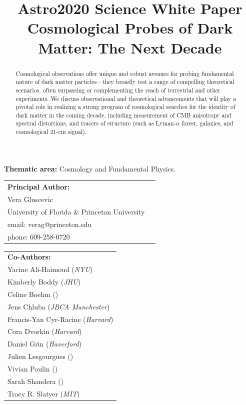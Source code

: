 \documentclass[12pt]{article}
\title{\textbf{Astro2020 Science White Paper}\\
\vspace{0.5cm}
Cosmological Probes of Dark Matter: The Next Decade}
\date{}
\author{}
\begin{document}
\maketitle
\vspace{-2cm}
\begin{center}
\textbf{Thematic area:} Cosmology and Fundamental Physics.     
\end{center}
\vspace{0.5cm}

{\begin{tabular}{ll}
\textbf{Principal Author:} \\
Vera Gluscevic & \\
University of Florida \& Princeton University & \\
email: verag@princeton.edu\\
phone: 609-258-0720 & 
\end{tabular}

\vspace{0.5cm}
{\begin{tabular}{l}
\textbf{Co-Authors:}\\
Yacine Ali-Haimoud (\textit{NYU})\\
Kimberly Boddy (\textit{JHU})\\
Celine Boehm (\textit{})\\
Jens Chluba (\textit{JBCA Manchester})\\
Francis-Yan Cyr-Racine (\textit{Harvard})\\
Cora Dvorkin (\textit{Harvard})\\
Daniel Grin (\textit{Haverford})\\
Julien Lesgourgues (\textit{})\\
Vivian Poulin (\textit{})\\
Sarah Shandera (\textit{})\\
Tracy R. Slatyer (\textit{MIT})\\
\end{tabular}}
}
\vspace{7mm}



\begin{abstract}
Cosmological observations offer unique and robust avenues for probing fundamental nature of dark matter particles---they broadly test a range of compelling theoretical scenarios, often surpassing or complementing the reach of terrestrial and other experiments.
We discuss observational and theoretical advancements that will play a pivotal role in realizing a strong program of cosmological searches for the identity of dark matter in the coming decade, including measurement of CMB anisotropy and spectral distortions, and tracers of structure (such as Lyman-$\alpha$ forest, galaxies, and cosmological 21-cm signal).

\end{abstract}
\end{document}
